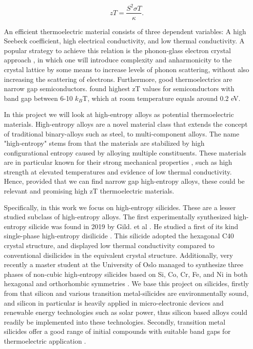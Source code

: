 \documentclass[UKenglish]{ifimaster}  %
\begin{document}
\begin{equation}
zT = \frac{S^2\sigma T}{\kappa}. 
\end{equation}

An efficient thermoelectric material consists of three dependent variables: A high Seebeck coefficient, high electrical conductivity, and low thermal conductivity. A popular strategy to achieve this relation is the phonon-glass electron crystal approach \cite{SnyderG.Jeffrey2008Ctm}, in which one will introduce complexity and anharmonicity to the crystal lattice by some means to increase levels of phonon scattering, without also increasing the scattering of electrons. Furthermore, good thermoelectrics are narrow gap semiconductors. \cite{TE_gap} found highest zT values for semiconductors with band gap between 6-10 $k_B$T, which at room temperature equals around 0.2 eV.   

In this project we will look at high-entropy alloys as potential thermoelectric materials. High-entropy alloys are a novel material class that extends the concept of traditional binary-alloys such as steel, to multi-component alloys. The name "high-entropy" stems from that the materials are stabilized by high configurational entropy caused by alloying multiple constituents. These materials are in particular known for their strong mechanical properties \cite{hea}, such as high strength at elevated temperatures and evidence of low thermal conductivity. Hence, provided that we can find narrow gap high-entropy alloys, these could be relevant and promising high zT thermoelectric materials.   

Specifically, in this work we focus on high-entropy silicides. These are a lesser studied subclass of high-entropy alloys. The first experimentally synthesized high-entropy silicide was found in 2019 by Gild. et al \cite{GILD2019337}. He studied a first of its kind single-phase high-entropy disilicide . This silicide adopted the hexagonal C40 crystal structure, and displayed low thermal conductivity compared to conventional disilicides in the equivalent crystal structure. Additionally, very recently a master student at the University of Oslo managed to synthesize three phases of non-cubic high-entropy silicides based on Si, Co, Cr, Fe, and Ni in both hexagonal and orthorhombic symmetries \cite{mari}. We base this project on silicides, firstly from that silicon and various transition metal-silicides are environmentally sound, and silicon in particular is heavily applied in micro-electronic devices and renewable energy technologies such as solar power, thus silicon based alloys could readily be implemented into these technologies. Secondly, transition metal silicides offer a good range of initial compounds with suitable band gaps for thermoelectric application \cite{silicde}.   
\end{document}
